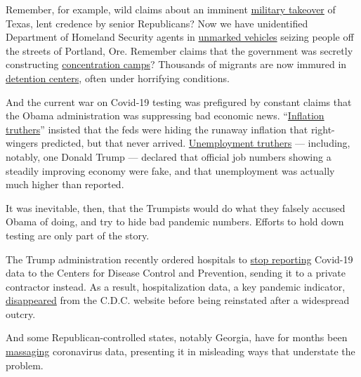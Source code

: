 Remember, for example, wild claims about an imminent
\href{https://www.vox.com/2015/5/6/8559577/jade-helm-conspiracy}{military
takeover} of Texas, lent credence by senior Republicans? Now we have
unidentified Department of Homeland Security agents in
\href{https://www.npr.org/2020/07/17/892277592/federal-officers-use-unmarked-vehicles-to-grab-protesters-in-portland}{unmarked
vehicles} seizing people off the streets of Portland, Ore. Remember
claims that the government was secretly constructing
\href{https://www.splcenter.org/fighting-hate/intelligence-report/2010/fear-fema}{concentration
camps}? Thousands of migrants are now immured in
\href{https://www.nbcnews.com/politics/immigration/thousands-immigrants-suffer-solitary-confinement-u-s-detention-centers-n1007881}{detention
centers}, often under horrifying conditions.

And the current war on Covid-19 testing was prefigured by constant
claims that the Obama administration was suppressing bad economic news.
``\href{https://theweek.com/articles/444851/why-wont-inflation-conspiracy-theories-just-die-already}{Inflation
truthers}'' insisted that the feds were hiding the runaway inflation
that right-wingers predicted, but that never arrived.
\href{https://ritholtz.com/2016/02/donald-trump-and-other-republicans-are-unemployment-truthers/}{Unemployment
truthers} --- including, notably, one Donald Trump --- declared that
official job numbers showing a steadily improving economy were fake, and
that unemployment was actually much higher than reported.

It was inevitable, then, that the Trumpists would do what they falsely
accused Obama of doing, and try to hide bad pandemic numbers. Efforts to
hold down testing are only part of the story.

The Trump administration recently ordered hospitals to
\href{https://www.nytimes3xbfgragh.onion/2020/07/14/us/politics/trump-cdc-coronavirus.html}{stop
reporting} Covid-19 data to the Centers for Disease Control and
Prevention, sending it to a private contractor instead. As a result,
hospitalization data, a key pandemic indicator,
\href{https://www.washingtonpost.com/health/2020/07/16/coronavirus-hospitalization-data-outcry/}{disappeared}
from the C.D.C. website before being reinstated after a widespread
outcry.

And some Republican-controlled states, notably Georgia, have for months
been \href{https://t.co/qxtnHTyOKS?amp=1}{massaging} coronavirus data,
presenting it in misleading ways that understate the problem.

